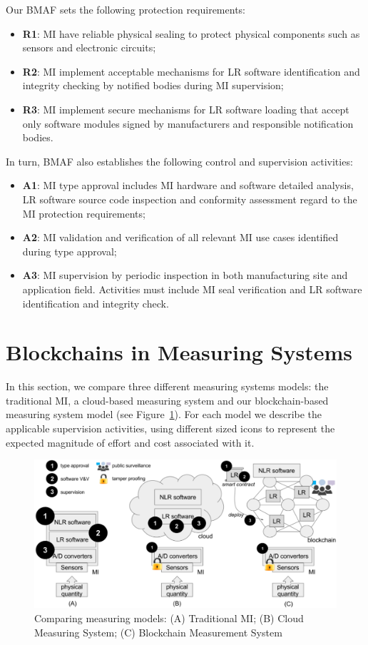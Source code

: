 \documentclass[journal]{IEEEtran} %
\begin{document}
Our BMAF sets the following protection requirements:
 \begin{itemize} 
 \item \textbf{R1}: MI have reliable physical sealing to protect physical components such as sensors and electronic circuits;
 \item \textbf{R2}: MI implement acceptable mechanisms for LR software identification and integrity checking by notified bodies during MI supervision;
 \item \textbf{R3}: MI implement secure mechanisms for LR software loading that accept only software modules signed by manufacturers and responsible notification bodies.
 \end{itemize} 

In turn, BMAF also establishes the following control and supervision activities:
 \begin{itemize} 
 \item \textbf{A1}: MI type approval includes MI hardware and software detailed analysis, LR software source code inspection and conformity assessment regard to the MI protection requirements;
 \item \textbf{A2}: MI validation and verification of all relevant MI use cases identified during type approval;
 \item \textbf{A3}: MI supervision by periodic inspection in both manufacturing site and application field. Activities must include MI seal verification and LR software identification and integrity check.
 \end{itemize} 

\section{Blockchains in Measuring Systems}
In this section, we compare three different measuring systems models: the traditional MI, a cloud-based measuring system and our blockchain-based measuring system model (see Figure~\ref{f:compare}). For each model we describe the applicable supervision activities, using different sized icons to represent the expected magnitude of effort and cost associated with it.

\begin{figure}[!t]
\centering
\includegraphics[width=.69\textwidth]{measuring} %
\caption{Comparing measuring models: (A) Traditional MI; (B) Cloud Measuring System; (C) Blockchain Measurement System}
\label{f:compare}
\end{figure}
\end{document}
